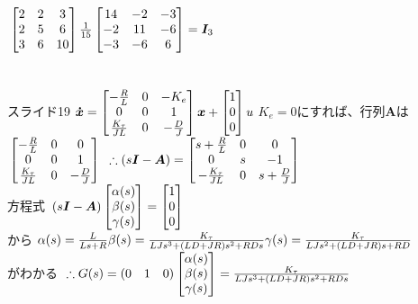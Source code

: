 \documentclass[12pt,a4paper]{article}
\begin{document}
$\\
\begin{bmatrix}
2 & 2 & 3\\
2 & 5 & 6\\
3 & 6 & 10
\end{bmatrix}
\frac{1}{15}
\begin{bmatrix}
14 & -2 & -3\\
-2 & 11 & -6\\
-3 & -6 & 6\\
\end{bmatrix}=\bm{I}_3$
\\
\\
\\
スライド19
$\\\bm{\dot{x}}=
\begin{bmatrix}
-\frac{R}{L} & 0 & -K_e\\
0 & 0 & 1\\
\frac{K_\tau}{JL} & 0 & -\frac{D}{J}
\end{bmatrix}\bm{x}+
\begin{bmatrix}
1\\
0\\
0\\
\end{bmatrix}u$
$K_e=0$にすれば、行列$\bm{A}$は
$\\
\begin{bmatrix}
-\frac{R}{L} & 0 & 0\\
0 & 0 & 1\\
\frac{K_\tau}{JL} & 0 & -\frac{D}{J}
\end{bmatrix}$
$\\\therefore \left(s\bm{I}-\bm{A}\right)=
\begin{bmatrix}
s+\frac{R}{L} & 0 & 0\\
0 & s & -1\\
-\frac{K_\tau}{JL} & 0 & s+\frac{D}{J}
\end{bmatrix}$
\\
方程式
$\\\left(s\bm{I}-\bm{A}\right)
\begin{bmatrix}
\alpha(s)\\
\beta(s)\\
\gamma(s)
\end{bmatrix}=
\begin{bmatrix}
1\\
0\\
0
\end{bmatrix}$
\\
から
$\\\alpha(s)=\frac{L}{Ls+R}
\\\beta(s)=\frac{K_\tau}{LJs^3+(LD+JR)s^2+RDs}
\\\gamma(s)=\frac{K_\tau}{LJs^2+(LD+JR)s+RD}$
\\
がわかる
$\\\therefore G(s)=(0\quad 1\quad 0)
\begin{bmatrix}
\alpha(s)\\
\beta(s)\\
\gamma(s)
\end{bmatrix}=\frac{K_\tau}{LJs^3+(LD+JR)s^2+RDs}$
\newpage
\end{document}
